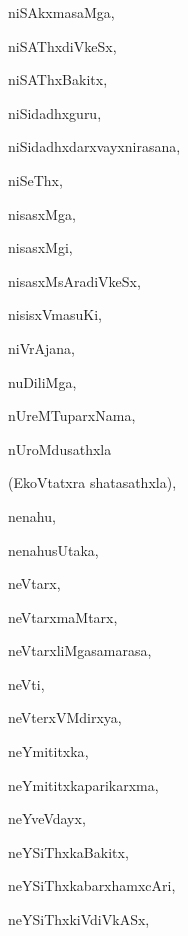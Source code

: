\begin{multicols}{3}
{\noindent
{niSAkxmasaMga}, \pageref{niSAkxmasaMga}

\noindent
{niSAThxdiVkeSx}, \pageref{niSAThxdiVkeSx}

\noindent
{niSAThxBakitx}, \pageref{niSAThxBakitx}

\noindent
{niSidadhxguru}, \pageref{niSidadhxguru}

\noindent
{niSidadhxdarxvayxnirasana}, \pageref{niSidadhxdarxvayxnirasana}

\noindent
{niSeThx}, \pageref{niSeThx}

\noindent
{nisasxMga}, \pageref{nisasxMga}

\noindent
{nisasxMgi}, \pageref{nisasxMgi}

\noindent
{nisasxMsAradiVkeSx}, \pageref{nisasxMsAradiVkeSx}

\noindent
{nisisxVmasuKi}, \pageref{nisisxVmasuKi}

\noindent
{niVrAjana}, \pageref{niVrAjana}

\noindent
{nuDiliMga}, \pageref{nuDiliMga}

\noindent
{nUreMTuparxNama}, \pageref{nUreMTuparxNama}

\noindent
{nUroMdusathxla}

\noindent
\qquad (EkoVtatxra shatasathxla), \pageref{nUroMdusathxlaEkoVtatxra shatasathxla}

\noindent
{nenahu}, \pageref{nenahu}

\noindent
{nenahusUtaka}, \pageref{nenahusUtaka}

\noindent
{neVtarx}, \pageref{neVtarx}

\noindent
{neVtarxmaMtarx}, \pageref{neVtarxmaMtarx}

\noindent
{neVtarxliMgasamarasa}, \pageref{neVtarxliMgasamarasa}

\noindent
{neVti}, \pageref{neVti}

\noindent
{neVterxVMdirxya}, \pageref{neVterxVMdirxya}

\noindent
{neYmititxka}, \pageref{neYmititxka}

\noindent
{neYmititxkaparikarxma}, \pageref{neYmititxkaparikarxma}

\noindent
{neYveVdayx}, \pageref{neYveVdayx}

\noindent
{neYSiThxkaBakitx}, \pageref{neYSiThxkaBakitx}

\noindent
{neYSiThxkabarxhamxcAri}, \pageref{neYSiThxkabarxhamxcAri}

\noindent
{neYSiThxkiVdiVkASx}, \pageref{neYSiThxkiVdiVkASx}

}
\end{multicols}
